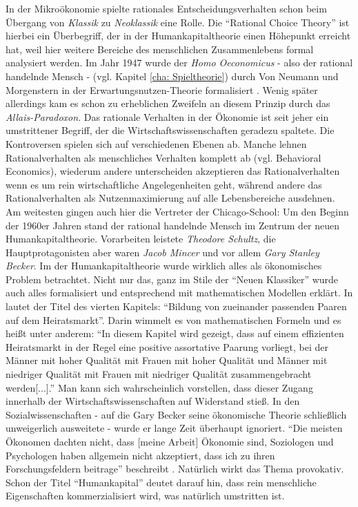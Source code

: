 In der Mikroökonomie spielte rationales Entscheidungsverhalten schon beim Übergang von \textit{Klassik} zu \textit{Neoklassik} eine Rolle. Die "`Rational Choice Theory"' ist hierbei ein Überbegriff, der in der Humankapitaltheorie einen Höhepunkt erreicht hat, weil hier weitere Bereiche des menschlichen Zusammenlebens formal analysiert werden. Im Jahr 1947 wurde der \textit{Homo Oeconomicus} - also der rational handelnde Mensch - (vgl. Kapitel \ref{cha: Spieltheorie}) durch Von Neumann und Morgenstern in der Erwartungsnutzen-Theorie formalisiert \parencite{VonNeumann1944}. Wenig später allerdings kam es schon zu erheblichen Zweifeln an diesem Prinzip durch das \textit{Allais-Paradoxon}. Das rationale Verhalten in der Ökonomie ist seit jeher ein umstrittener Begriff, der die Wirtschaftswissenschaften geradezu spaltete. Die Kontroversen spielen sich auf verschiedenen Ebenen ab. Manche lehnen Rationalverhalten als menschliches Verhalten komplett ab (vgl. Behavioral Economics), wiederum andere unterscheiden akzeptieren das Rationalverhalten wenn es um rein wirtschaftliche Angelegenheiten geht, während andere das Rationalverhalten als Nutzenmaximierung auf alle Lebensbereiche ausdehnen. Am weitesten gingen auch hier die Vertreter der Chicago-School: Um den Beginn der 1960er Jahren stand der rational handelnde Mensch im Zentrum der neuen Humankapitaltheorie. Vorarbeiten leistete \textit{Theodore Schultz}, die Hauptprotagonisten aber waren \textit{Jacob Mincer} und vor allem \textit{Gary Stanley Becker}. Im der Humankapitaltheorie wurde wirklich alles als ökonomisches Problem betrachtet. Nicht nur das, ganz im Stile der "`Neuen Klassiker"' wurde auch alles formalisiert und entsprechend mit mathematischen Modellen erklärt.
In \textcite[Ausgabe von 1991: S. 108]{Becker1981} lautet der Titel des vierten Kapitels: "`Bildung von zueinander passenden Paaren auf dem Heiratsmarkt"'. Darin wimmelt es von mathematischen Formeln und es heißt unter anderem: "`In diesem Kapitel wird gezeigt, dass auf einem effizienten Heiratsmarkt in der Regel eine positive assortative Paarung vorliegt, bei der Männer mit hoher Qualität mit Frauen mit hoher Qualität und Männer mit niedriger Qualität mit Frauen mit niedriger Qualität zusammengebracht werden[...]."'
Man kann sich wahrscheinlich vorstellen, dass dieser Zugang innerhalb der Wirtschaftswissenschaften auf Widerstand stieß. In den Sozialwissenschaften - auf die Gary Becker seine ökonomische Theorie schließlich unweigerlich ausweitete - wurde er lange Zeit überhaupt ignoriert. "`Die meisten Ökonomen dachten nicht, dass [meine Arbeit] Ökonomie sind, Soziologen und Psychologen haben allgemein nicht akzeptiert, dass ich zu ihren Forschungsfeldern beitrage"' beschreibt \textcite{Becker1992}. Natürlich wirkt das Thema provokativ. Schon der Titel "`Humankapital"' deutet darauf hin, dass rein menschliche Eigenschaften kommerzialisiert wird, was natürlich umstritten ist.

